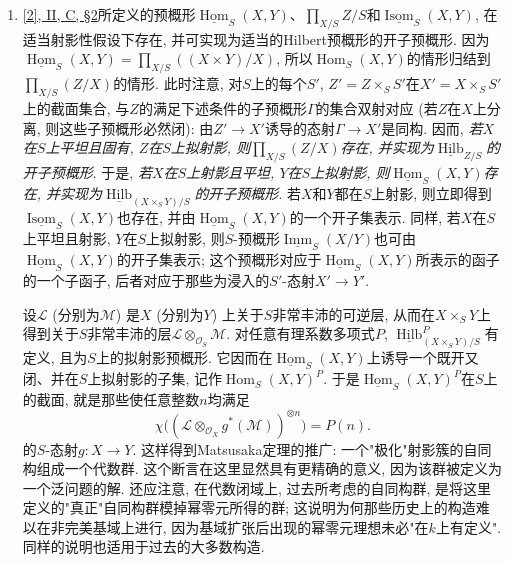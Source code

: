 \begin{enumerate}
  
 \item[c.]
    
\par{}\label{fga3.iv-4.c} \hyperref[fga3.ii-c.2]{[2], II, C, §2}所定义的预概形\(\underline {\operatorname {Hom}}_S(X,Y)\)、\(\prod _{X/S}Z/S\)和\(\underline {\operatorname {Isom}}_S(X,Y)\), 在适当射影性假设下存在, 并可实现为适当的Hilbert预概形的开子预概形. 因为\(\underline {\operatorname {Hom}}_S(X,Y)=\prod _{X/S}((X\times  Y)/X)\), 所以\(\operatorname {Hom}_S(X,Y)\)的情形归结到\(\prod _{X/S}(Z/X)\)的情形. 此时注意, 对\(S\)上的每个\(S'\), \(Z'=Z\times _S S'\)在\(X'=X\times _S S'\)上的截面集合, 与\(Z\)的满足下述条件的子预概形\(\Gamma \)的集合双射对应 (若\(Z\)在\(X\)上分离, 则这些子预概形必然闭): 由\(Z'\to  X'\)诱导的态射\(\Gamma \to  X'\)是同构. 因而, \emph{若\(X\)在\(S\)上平坦且固有, \(Z\)在\(S\)上拟射影, 则\(\prod _{X/S}(Z/X)\)存在, 并实现为\(\underline {\operatorname {Hilb}}_{Z/S}\)的开子预概形}. 于是, \emph{若\(X\)在\(S\)上射影且平坦, \(Y\)在\(S\)上拟射影, 则\(\underline {\operatorname {Hom}}_S(X,Y)\)存在, 并实现为\(\underline {\operatorname {Hilb}}_{(X\times _S Y)/S}\)的开子预概形}. 若\(X\)和\(Y\)都在\(S\)上射影, 则立即得到\(\underline {\operatorname {Isom}}_S(X,Y)\)也存在, 并由\(\underline {\operatorname {Hom}}_S(X,Y)\)的一个开子集表示. 同样, 若\(X\)在\(S\)上平坦且射影, \(Y\)在\(S\)上拟射影, 则\(S\)-预概形\(\underline {\operatorname {Imm}}_S(X/Y)\)也可由\(\underline {\operatorname {Hom}}_S(X,Y)\)的开子集表示; 这个预概形对应于\(\underline {\operatorname {Hom}}_S(X,Y)\)所表示的函子的一个子函子, 后者对应于那些为浸入的\(S'\)-态射\(X'\to  Y'\).

    
\par{}设\(\mathscr {L}\) (分别为\(\mathscr {M}\)) 是\(X\) (分别为\(Y\)) 上关于\(S\)非常丰沛的可逆层, 从而在\(X\times _S Y\)上得到关于\(S\)非常丰沛的层\(\mathscr {L}\otimes _{\mathcal {O}_S}\mathscr {M}\). 对任意有理系数多项式\(P\), \(\underline {\operatorname {Hilb}}_{(X\times _S Y)/S}^P\)有定义, 且为\(S\)上的拟射影预概形. 它因而在\(\underline {\operatorname {Hom}}_S(X,Y)\)上诱导一个既开又闭、并在\(S\)上拟射影的子集, 记作\(\operatorname {Hom}_S(X,Y)^P\). 于是\(\underline {\operatorname {Hom}}_S(X,Y)^P\)在\(S\)上的截面, 就是那些使任意整数\(n\)均满足\[         \chi \Big ((\mathscr {L}\otimes _{\mathcal {O}_X}g^*(\mathscr {M}))^{\otimes  n}\Big )         = P(n).       \]的\(S\)-态射\(g\colon  X\to  Y\). 这样得到Matsusaka定理的推广: 一个"极化"射影簇的自同构组成一个代数群. 这个断言在这里显然具有更精确的意义, 因为该群被定义为一个泛问题的解. 还应注意, 在代数闭域上, 过去所考虑的自同构群, 是将这里定义的"真正"自同构群模掉幂零元所得的群; 这说明为何那些历史上的构造难以在非完美基域上进行, 因为基域扩张后出现的幂零元理想未必"在\(k\)上有定义". 同样的说明也适用于过去的大多数构造.
  

\end{enumerate}
